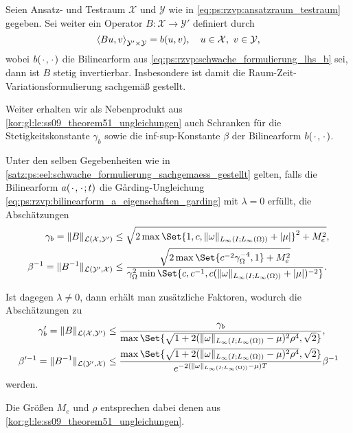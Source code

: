 \begin{Korollar}
\label{satz:ps:eel:schwache_formulierung_sachgemaess_gestellt}
    Seien Ansatz- und Testraum $\mathcal X$ und $\mathcal Y$ wie in \cref{eq:ps:rzvp:ansatzraum_testraum} gegeben.
    Sei weiter ein Operator $B \colon \mathcal X \to \mathcal Y'$ definiert durch
    \begin{equation}
        \left\langle Bu,v\right\rangle_{\mathcal Y' \times \mathcal Y}  = b(u, v), \quad u \in \mathcal X,~ v \in \mathcal Y,
    \end{equation}
    wobei $b({\mkern2mu\cdot\mkern2mu}, {\mkern2mu\cdot\mkern2mu})$ die Bilinearform aus \cref{eq:ps:rzvp:schwache_formulierung_lhs_b} sei,
    dann ist $B$ stetig invertierbar.
    Insbesondere ist damit die Raum-Zeit-Variationsformulierung sachgemäß gestellt.
\end{Korollar}

Weiter erhalten wir als Nebenprodukt aus \cref{kor:gl:le:ss09_theorem51_ungleichungen} auch Schranken für die Stetigkeitskonstante $\gamma_{b}$ sowie die inf-sup-Konstante $\beta$ der Bilinearform $b({\mkern2mu\cdot\mkern2mu}, {\mkern2mu\cdot\mkern2mu})$.

\begin{Korollar}
\label{kor:ps:eel:schwache_formulierung_operator_schranken}
    Unter den selben Gegebenheiten wie in \cref{satz:ps:eel:schwache_formulierung_sachgemaess_gestellt} gelten, falls die Bilinearform $a({\mkern2mu\cdot\mkern2mu}, {\mkern2mu\cdot\mkern2mu};t)$ die G\aa{}rding-Ungleichung \cref{eq:ps:rzvp:bilinearform_a_eigenschaften_garding} mit $\lambda = 0$ erfüllt, die Abschätzungen
    \begin{align}
        \gamma_{b} = \norm{B}_{\mathcal L(\mathcal X, \mathcal Y')} &\leq \sqrt{2 \max\Set{ 1, c, \norm{\omega}_{L_{\infty}(I; L_{\infty}(\Omega))} + \abs{\mu} }^{2} + M_{e}^{2} }, \\
        \beta^{-1} = \norm{B^{-1}}_{\mathcal L(\mathcal Y', \mathcal X)} &\leq \frac{\sqrt{2 \max\Set{c^{-2}\gamma_{\Omega}^{-4}, 1} + M_{e}^{2}}}{\gamma_{\Omega}^{2} \min\Set{c, c^{-1}, c (\norm{\omega}_{L_{\infty}(I; L_{\infty}(\Omega))} + \abs{\mu})^{-2}}}.
    \end{align}

    Ist dagegen $\lambda \neq 0$, dann erhält man zusätzliche Faktoren, wodurch die Abschätzungen zu
    \begin{align}
        \gamma'_{b} = \norm{B}_{\mathcal L(\mathcal X, \mathcal Y')} &\leq \frac{\gamma_{b}}{\max\Set{\sqrt{1 + 2 (\norm{\omega}_{L_{\infty}(I; L_{\infty}(\Omega))} - \mu)^{2} \rho^{4} }, \sqrt{2}}}, \\
        \beta'^{-1} = \norm{B^{-1}}_{\mathcal L(\mathcal Y', \mathcal X)} &\leq \frac{\max\Set{\sqrt{1 + 2 (\norm{\omega}_{L_{\infty}(I; L_{\infty}(\Omega))} - \mu)^{2} \rho^{4} }, \sqrt{2}}}{e^{-2(\norm{\omega}_{L_{\infty}(I; L_{\infty}(\Omega))} - \mu) T}} \beta^{-1}
    \end{align}
    werden.

    Die Größen $M_{e}$ und $\rho$ entsprechen dabei denen aus \cref{kor:gl:le:ss09_theorem51_ungleichungen}.
\end{Korollar}

